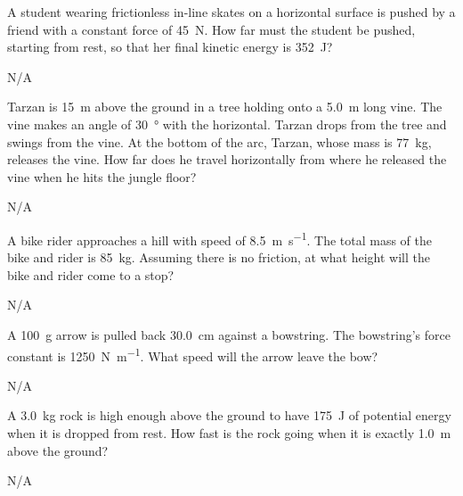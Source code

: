 \begin{question}[ID=energy-A-Q04,topic=energy,difficulty=A]
    A student wearing frictionless in-line skates on a horizontal
        surface is pushed by a friend with a constant force
        of \SI{45}{\newton}.
    How far must the student be pushed, starting from rest, so that
        her final kinetic energy is \SI{352}{\joule}?
\end{question}
\begin{solution}
    N/A
\end{solution}


\begin{question}[ID=energy-A-Q05,topic=energy,difficulty=A]
    Tarzan is \SI{15}{\meter} above the ground in a tree
        holding onto a \SI{5.0}{\meter} long vine.
    The vine makes an angle of \SI{30}{\degree} with
        the horizontal.
    Tarzan drops from the tree and swings from the vine.
    At the bottom of the arc, Tarzan, whose mass is
        \SI{77}{\kilo\gram}, releases the vine.
    How far does he travel horizontally from where he released
        the vine when he hits the jungle floor?
\end{question}
\begin{solution}
    N/A
\end{solution}


\begin{question}[ID=energy-B-Q01,topic=energy,difficulty=B]
    A bike rider approaches a hill with speed
        of \SI{8.5}{\meter\per\second}.
    The total mass of the bike and rider is
        \SI{85}{\kilo\gram}.
    Assuming there is no friction, at what
        height will the bike and rider come
        to a stop?
\end{question}
\begin{solution}
    N/A
\end{solution}


\begin{question}[ID=energy-B-Q02,topic=energy,difficulty=B]
    A \SI{100}{\gram} arrow is pulled back \SI{30.0}{\centi\meter}
        against a bowstring.
    The bowstring's force constant is \SI{1250}{\newton\per\meter}.
    What speed will the arrow leave the bow?
\end{question}
\begin{solution}
    N/A
\end{solution}


\begin{question}[ID=energy-B-Q03,topic=energy,difficulty=B]
    A \SI{3.0}{\kilo\gram} rock is high enough above the ground
        to have \SI{175}{\joule} of potential energy when it
        is dropped from rest.
    How fast is the rock going when it is exactly \SI{1.0}{\meter}
        above the ground?
\end{question}
\begin{solution}
    N/A
\end{solution}


